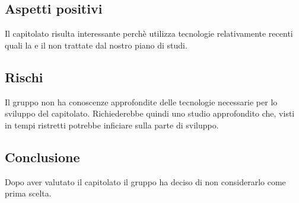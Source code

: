 \documentclass[../studio-di-fattibilita.tex]{subfiles}
\begin{document}
\subsection{Aspetti positivi}%
\label{sub:aspetti_positivi}
Il capitolato risulta interessante perchè utilizza tecnologie relativamente recenti quali la 
e il   non trattate dal nostro piano di studi.  

\subsection{Rischi}%
\label{sub:rischi}
Il gruppo non ha conoscenze approfondite delle tecnologie necessarie per lo sviluppo del capitolato. Richiederebbe 
quindi uno studio approfondito che, visti in tempi ristretti potrebbe inficiare sulla parte di sviluppo.

\subsection{Conclusione}%
\label{sub:conclusione}
Dopo aver valutato il capitolato il gruppo ha deciso di non considerarlo come prima scelta. 
\end{document}

